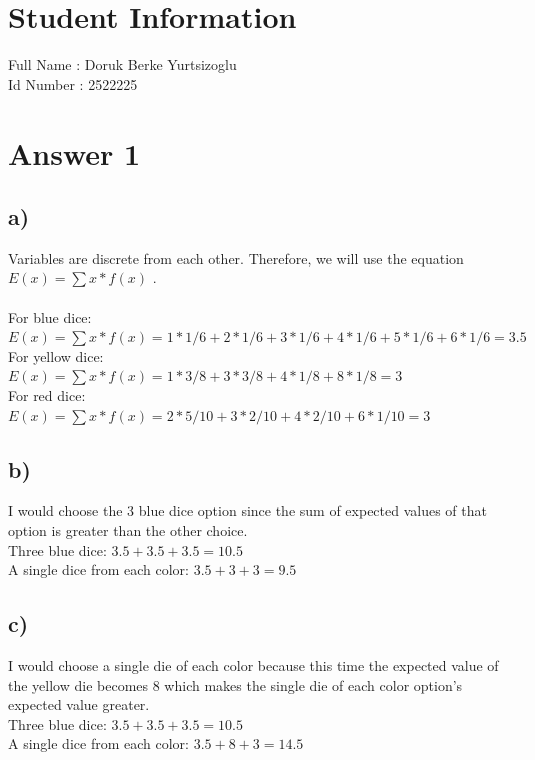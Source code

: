 \documentclass[12pt]{article}
\begin{document}
\section*{Student Information } 
Full Name :  Doruk Berke Yurtsizoglu\\
Id Number :  2522225\\

\section*{Answer 1}

\subsection*{a)} 
Variables are discrete from each other. Therefore, we will use the equation $E(x) = \sum x*f(x)$ .\\
\\
For blue dice:\\
$E(x) = \sum x*f(x) = 1*1/6 + 2*1/6 + 3*1/6 + 4*1/6 + 5*1/6 + 6*1/6 = 3.5$\\
For yellow dice:\\
$E(x) = \sum x*f(x) = 1*3/8 + 3*3/8 + 4*1/8 + 8*1/8 = 3$\\
For red dice:\\
$E(x) = \sum x*f(x) = 2*5/10 + 3*2/10 + 4*2/10 + 6*1/10 = 3$\\

\subsection*{b)} 
I would choose the 3 blue dice option since the sum of expected values of that option is greater than the other choice.\\
Three blue dice: $3.5+3.5+3.5 = 10.5$\\
A single dice from each color: $3.5 + 3 + 3 = 9.5$\\

\subsection*{c)} 
I would choose a single die of each color because this time the expected value of the yellow die becomes 8 which makes the single die of each color option's expected value greater.\\
Three blue dice: $3.5+3.5+3.5 = 10.5$\\
A single dice from each color: $3.5 + 8 + 3 = 14.5$\\
\end{document}
